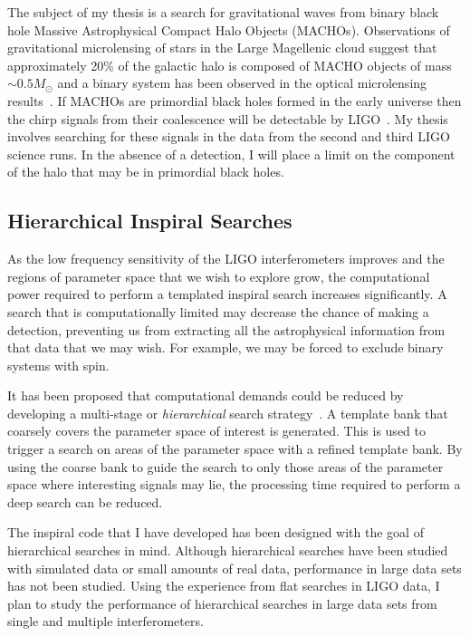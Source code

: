 The subject of my thesis is a search for gravitational waves from binary black
hole Massive Astrophysical Compact Halo Objects (MACHOs).  Observations of
gravitational microlensing of stars in the Large Magellenic cloud suggest that
approximately 20\% of the galactic halo is composed of MACHO objects of mass
$\sim 0.5M_\odot$ and a binary system has been observed in the optical
microlensing results~\cite{Alcock:2000ph}. If MACHOs are primordial black holes
formed in the early universe then the chirp signals from their coalescence
will be detectable by LIGO~\cite{Nakamura:1997sm}. My thesis involves
searching for these signals in the data from the second and third LIGO science
runs.  In the absence of a detection, I will place a limit on the component of
the halo that may be in primordial black holes.

\subsection{Hierarchical Inspiral Searches}

As the low frequency sensitivity of the LIGO interferometers improves and the
regions of parameter space that we wish to explore grow, the computational
power required to perform a templated inspiral search increases significantly.
A search that is computationally limited may decrease the chance of making a
detection, preventing us from extracting all the astrophysical information
from that data that we may wish. For example, we may be forced to
exclude binary systems with spin.

It has been proposed that computational demands could be reduced by developing
a multi-stage or \emph{hierarchical} search
strategy~\cite{Mohanty:1996bw,Mohanty:1998eu,Tanaka:2000xy}. A template bank
that coarsely covers the parameter space of interest is generated. This is
used to trigger a search on areas of the parameter space with a refined
template bank. By using the coarse bank to guide the search to only those
areas of the parameter space where interesting signals may lie, the
processing time required to perform a deep search can be reduced. 

The inspiral code that I have developed has been designed with the goal of
hierarchical searches in mind.  Although hierarchical searches have been
studied with simulated data or small amounts of real data, performance in
large data sets has not been studied. Using the experience from flat searches
in LIGO data, I plan to study the performance of hierarchical searches in
large data sets from single and multiple interferometers.

